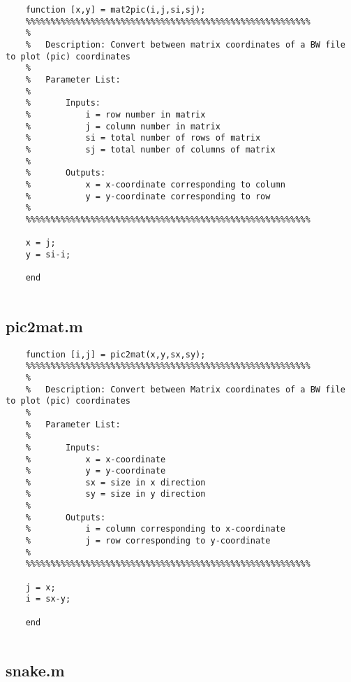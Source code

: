 \begin{lstlisting}
	function [x,y] = mat2pic(i,j,si,sj);
	%%%%%%%%%%%%%%%%%%%%%%%%%%%%%%%%%%%%%%%%%%%%%%%%%%%%%%%%%
	%
	%	Description: Convert between matrix coordinates of a BW file to plot (pic) coordinates
	%
	%	Parameter List:
	%
	%		Inputs:
	%			i = row number in matrix
	%			j = column number in matrix
	%			si = total number of rows of matrix
	%			sj = total number of columns of matrix
	%
	%		Outputs:
	%			x = x-coordinate corresponding to column
	%			y = y-coordinate corresponding to row
	%
	%%%%%%%%%%%%%%%%%%%%%%%%%%%%%%%%%%%%%%%%%%%%%%%%%%%%%%%%%
	
	x = j;
	y = si-i;
	
	end
	
\end{lstlisting}

\newpage

\subsection{pic2mat.m}

\begin{lstlisting}
	function [i,j] = pic2mat(x,y,sx,sy);
	%%%%%%%%%%%%%%%%%%%%%%%%%%%%%%%%%%%%%%%%%%%%%%%%%%%%%%%%%
	%
	%	Description: Convert between Matrix coordinates of a BW file to plot (pic) coordinates
	%
	%	Parameter List:
	%
	%		Inputs:
	%			x = x-coordinate
	%			y = y-coordinate
	%			sx = size in x direction
	%			sy = size in y direction
	%
	%		Outputs:
	%			i = column corresponding to x-coordinate
	%			j = row corresponding to y-coordinate
	%
	%%%%%%%%%%%%%%%%%%%%%%%%%%%%%%%%%%%%%%%%%%%%%%%%%%%%%%%%%
	
	j = x;
	i = sx-y;
	
	end
	
\end{lstlisting}

\newpage

\subsection{snake.m}

